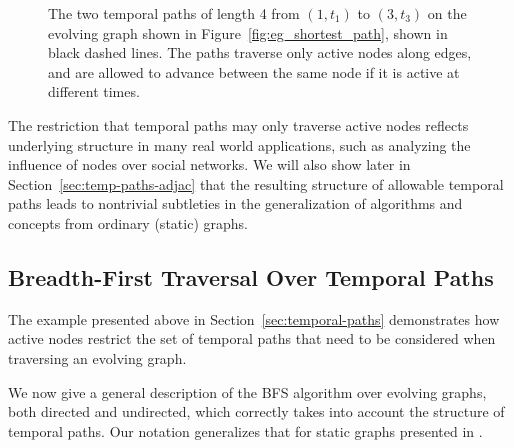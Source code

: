 \documentclass[10pt,conference,compsocconf]{IEEEtran}
\theoremstyle{definition}
\begin{document}
\begin{figure}[h]
\begin{center}
\end{center}
\caption{The two temporal paths of length 4 from $(1, t_1)$ to $(3,t_3)$ on the evolving graph
shown in Figure~\ref{fig:eg_shortest_path}, shown in black dashed lines.
The paths traverse only active nodes along edges, and are allowed to advance
between the same node if it is active at different times.}
\label{fig:active}
\end{figure}

The restriction that temporal paths may only traverse active nodes reflects
underlying structure in many real world applications, such as analyzing the
influence of nodes over social networks. We will also show later in
Section~\ref{sec:temp-paths-adjac}
that the resulting structure of allowable temporal paths leads to nontrivial
subtleties in the generalization of algorithms and concepts from ordinary
(static) graphs.



\subsection{Breadth-First Traversal Over Temporal Paths}
\label{sec:evolving-graph-bfs}

The example presented above in Section~\ref{sec:temporal-paths}
demonstrates how active nodes restrict the set of temporal paths
that need to be considered when traversing an evolving graph.

We now give a general description of the BFS algorithm over evolving graphs,
both directed and undirected, which correctly takes into account the structure
of temporal paths.
Our notation generalizes that for static graphs presented in \cite{even12,kegi11}.
\end{document}
